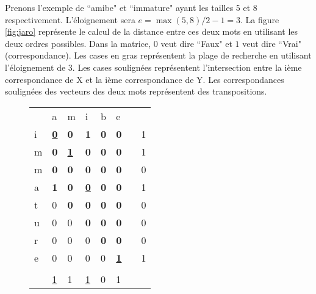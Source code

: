 \documentclass{KodeBook}
\begin{document}
Prenons l'exemple de ``amibe"  et ``immature" ayant les tailles 5 et 8 respectivement.
L'éloignement sera $e=\max(5, 8)/2 - 1 = 3$.
La figure \ref{fig:jaro} représente le calcul de la distance entre ces deux mots en utilisant les deux ordres possibles.
Dans la matrice, $0$ veut dire ``Faux" et $1$  veut dire ``Vrai" (correspondance). 
Les cases en gras représentent la plage de recherche en utilisant l'éloignement de 3. 
Les cases soulignées représentent l'intersection entre la ième correspondance de X et la ième correspondance de Y.
Les correspondances soulignées des vecteurs des deux mots représentent des transpositions. 

\begin{figure}[!ht]
	
\begin{minipage}{0.45\textwidth}
\small
\begin{tabular}{|l|l|l|l|l|l|l|l|}
	\cline{1-6}
	  & a & m & i & b & e & \multicolumn{2}{l}{ }\\
	\cline{1-6}\cline{8-8}
	i & \underline{\textbf{0}} & \textbf{0} & \textbf{1} & \textbf{0} & \textbf{0} & & 1\\
	\cline{1-6}\cline{8-8}
	m & \textbf{0} & \underline{\textbf{1}} & \textbf{0} & \textbf{0} & \textbf{0} & & 1\\
	\cline{1-6}\cline{8-8}
	m & \textbf{0} & \textbf{0} & \textbf{0} & \textbf{0} & \textbf{0} & & 0\\
	\cline{1-6}\cline{8-8}
	a & \textbf{1} & \textbf{0} & \underline{\textbf{0}} & \textbf{0} & \textbf{0} & & 1\\
	\cline{1-6}\cline{8-8}
	t & 0 & \textbf{0} & \textbf{0} & \textbf{0} & \textbf{0} & & 0\\
	\cline{1-6}\cline{8-8}
	u & 0 & 0 & \textbf{0} & \textbf{0} & \textbf{0} & & 0\\
	\cline{1-6}\cline{8-8}
	r & 0 & 0 & 0 & \textbf{0} & \textbf{0} & & 0\\
	\cline{1-6}\cline{8-8}
	e & 0 & 0 & 0 & 0 & \underline{\textbf{1}} & & 1\\
	\cline{1-6}\cline{8-8}
	\multicolumn{8}{l}{ }\\
	\cline{2-6}
	 \multicolumn{1}{l|}{} & \underline{1} & 1 & \underline{1} & 0 & 1 & \multicolumn{2}{l}{ }\\
	\cline{2-6}
\end{tabular}

\end{minipage}
\begin{minipage}{0.45\textwidth}


\end{minipage}
\end{figure}
\end{document}
